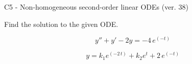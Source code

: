\begin{exercise}
  \begin{exerciseTitle}C5 - Non-homogeneous second-order linear ODEs (ver. 38)\end{exerciseTitle}
  \begin{exerciseStatement}
    
Find the solution to the given ODE.

    
\[y''+y'-2y = -4 \, e^{\left(-t\right)}\]

  \end{exerciseStatement}
  \begin{exerciseAnswer}
    
\[y= k_{1} e^{\left(-2 \, t\right)} + k_{2} e^{t} + 2 \, e^{\left(-t\right)}\]

  \end{exerciseAnswer}
\end{exercise}